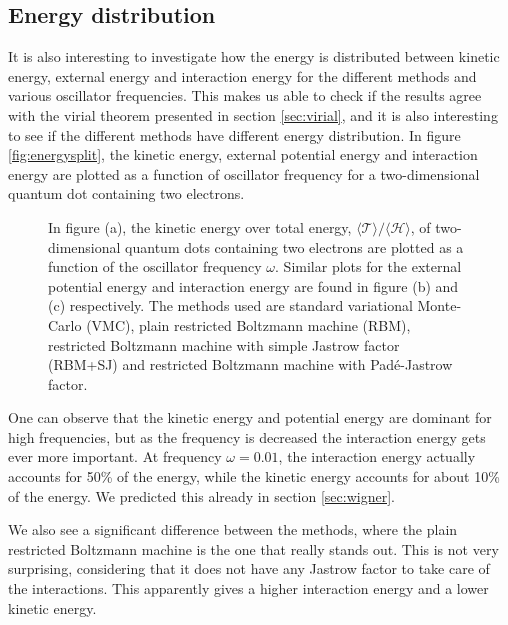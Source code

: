 \subsection{Energy distribution}
It is also interesting to investigate how the energy is distributed between kinetic energy, external energy and interaction energy for the different methods and various oscillator frequencies. This makes us able to check if the results agree with the virial theorem presented in section \ref{sec:virial}, and it is also interesting to see if the different methods have different energy distribution. In figure \eqref{fig:energysplit}, the kinetic energy, external potential energy and interaction energy are plotted as a function of oscillator frequency for a two-dimensional quantum dot containing two electrons.  
\begin{figure}[H]  
	\centering 
	\caption{In figure (a), the kinetic energy over total energy, $\langle\mathcal{T}\rangle/\langle\mathcal{H}\rangle$, of two-dimensional quantum dots containing two electrons are plotted as a function of the oscillator frequency $\omega$. Similar plots for the external potential energy and interaction energy are found in figure (b) and (c) respectively. The methods used are standard variational Monte-Carlo (VMC), plain restricted Boltzmann machine (RBM), restricted Boltzmann machine with simple Jastrow factor (RBM+SJ) and restricted Boltzmann machine with Padé-Jastrow factor.}
	\label{fig:energysplit}
\end{figure} 

One can observe that the kinetic energy and potential energy are dominant for high frequencies, but as the frequency is decreased the interaction energy gets ever more important. At frequency $\omega=0.01$, the interaction energy actually accounts for 50\% of the energy, while the kinetic energy accounts for about 10\% of the energy. We predicted this already in section \ref{sec:wigner}.

We also see a significant difference between the methods, where the plain restricted Boltzmann machine is the one that really stands out. This is not very surprising, considering that it does not have any Jastrow factor to take care of the interactions. This apparently gives a higher interaction energy and a lower kinetic energy. 

